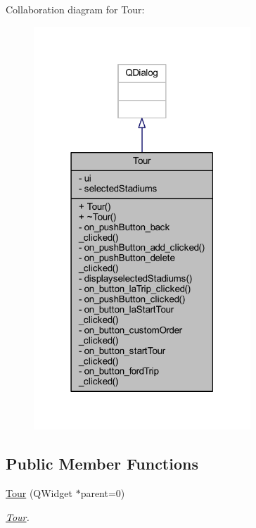 Collaboration diagram for Tour\+:
\nopagebreak
\begin{figure}[H]
\begin{center}
\leavevmode
\includegraphics[width=231pt]{class_tour__coll__graph}
\end{center}
\end{figure}
\subsection*{Public Member Functions}
\begin{DoxyCompactItemize}
\item 
\hyperlink{class_tour_af2f0737a5f0fac6b6bd564a999525ee1}{Tour} (Q\+Widget $\ast$parent=0)
\begin{DoxyCompactList}\small\item\em \hyperlink{class_tour}{Tour}. \end{DoxyCompactList}\end{DoxyCompactItemize}

